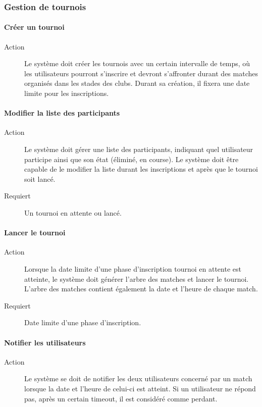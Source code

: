 \documentclass[a4paper]{article}
\begin{document}
\subsubsection{Gestion de tournois}
\paragraph{Créer un tournoi}
\begin{description}
\item[Action] Le système doit créer les tournois avec un certain intervalle de temps, où les \glspl{utilisateur} pourront s'inscrire et devront s'affronter durant des matches organisés dans les stades des \glspl{club}.
Durant sa création, il fixera une date limite pour les inscriptions.
\end{description}

\paragraph{Modifier la liste des participants}
\begin{description}
\item[Action] Le système doit gérer une liste des participants, indiquant quel \gls{utilisateur} participe ainsi que son état (éliminé, en course). Le système doit être capable de le modifier la liste durant les inscriptions et après que le tournoi soit lancé.
\item[Requiert] Un tournoi en attente ou lancé.
\end{description}

\paragraph{Lancer le tournoi}
\begin{description}
\item[Action] Lorsque la date limite d'une phase d'inscription tournoi en attente est atteinte, le système doit générer l'arbre des matches et lancer le tournoi. L'arbre des matches contient également la date et l'heure de chaque match.
\item[Requiert] Date limite d'une phase d'inscription.
\end{description}

\paragraph{Notifier les utilisateurs}
\begin{description}
\item[Action] Le système se doit de notifier les deux \glspl{utilisateur} concerné par un match lorsque la date et l'heure de celui-ci est atteint. Si un \gls{utilisateur} ne répond pas, après un certain timeout, il est considéré comme perdant.
\end{description}
\end{document}
